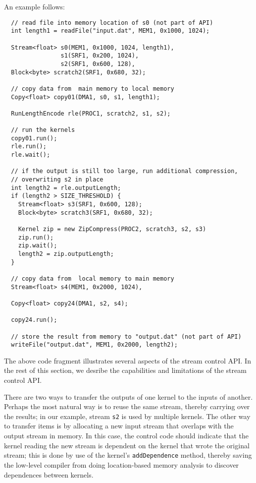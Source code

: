 An example follows:
{\small
\begin{verbatim}
  // read file into memory location of s0 (not part of API)
  int length1 = readFile("input.dat", MEM1, 0x1000, 1024);

  Stream<float> s0(MEM1, 0x1000, 1024, length1),
                s1(SRF1, 0x200, 1024),
                s2(SRF1, 0x600, 128), 
  Block<byte> scratch2(SRF1, 0x680, 32);

  // copy data from  main memory to local memory
  Copy<float> copy01(DMA1, s0, s1, length1);

  RunLengthEncode rle(PROC1, scratch2, s1, s2);

  // run the kernels
  copy01.run();
  rle.run();
  rle.wait();

  // if the output is still too large, run additional compression, 
  // overwriting s2 in place
  int length2 = rle.outputLength;
  if (length2 > SIZE_THRESHOLD) {
    Stream<float> s3(SRF1, 0x600, 128);
    Block<byte> scratch3(SRF1, 0x680, 32);
    
    Kernel zip = new ZipCompress(PROC2, scratch3, s2, s3)
    zip.run();
    zip.wait();
    length2 = zip.outputLength;
  }
  
  // copy data from  local memory to main memory
  Stream<float> s4(MEM1, 0x2000, 1024),
  
  Copy<float> copy24(DMA1, s2, s4);
  
  copy24.run();

  // store the result from memory to "output.dat" (not part of API)
  writeFile("output.dat", MEM1, 0x2000, length2);
\end{verbatim}}

The above code fragment illustrates several aspects of the stream
control API.  In the rest of this section, we desribe the 
capabilities and limitations of the stream control API.


There are two ways to transfer the outputs of one kernel to the
inputs of another.  Perhaps the most natural way is to reuse the same
stream, thereby carrying over the results; in our
example, stream {\tt s2} is used by multiple kernels.  The other way to
transfer items is by allocating a new input stream that overlaps with
the output stream in memory.  In this case,
the control code should indicate that the kernel reading the new
stream is dependent on the kernel that wrote the original stream; this
is done by use of the kernel's {\tt addDependence} method, thereby
saving the low-level compiler from doing location-based memory
analysis to discover dependences between kernels.

